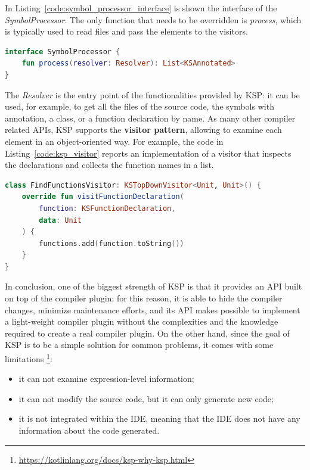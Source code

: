 In Listing~\ref{code:symbol_processor_interface} is shown the interface of the \textit{SymbolProcessor}.\newline
The only function that needs to be overridden is \textit{process}, which is typically used to read files and pass the elements to the visitors.
\begin{lstlisting}[caption={SymbolProcessor interface}, language=Kotlin, captionpos=b, label={code:symbol_processor_interface}]
interface SymbolProcessor {
    fun process(resolver: Resolver): List<KSAnnotated>
}
\end{lstlisting}
The \textit{Resolver} is the entry point of the functionalities provided by KSP: it can be used, for example, to get all the files of the source code, the symbols with annotation, a class, or a function declaration by name.\newline
As many other compiler related APIs, KSP supports the \textbf{visitor pattern}, allowing to examine each element in an object-oriented way.\newline
For example, the code in Listing~\ref{code:ksp_visitor} reports an implementation of a visitor that inspects the declarations and collects the function names in a list.
\begin{lstlisting}[caption={Visitor that collects function declarations}, language=Kotlin, captionpos=b, label={code:ksp_visitor}]
class FindFunctionsVisitor: KSTopDownVisitor<Unit, Unit>() {
    override fun visitFunctionDeclaration(
        function: KSFunctionDeclaration,
        data: Unit
    ) {
        functions.add(function.toString())
    }
}
\end{lstlisting}

In conclusion, one of the biggest strength of KSP is that it provides an API built on top of the compiler plugin: for this reason, it is able to hide the compiler changes, minimize maintenance efforts, and its API makes possible to implement a light-weight compiler plugin without the complexities and the knowledge required to create a real compiler plugin.\newline
On the other hand, since the goal of KSP is to be a simple solution for common problems, it comes with some limitations \footnote{\url{https://kotlinlang.org/docs/ksp-why-ksp.html}}:
\begin{itemize}
    \item it can not examine expression-level information;
    \item it can not modify the source code, but it can only generate new code;
    \item it is not integrated within the IDE, meaning that the IDE does not have any information about the code generated.
\end{itemize}

